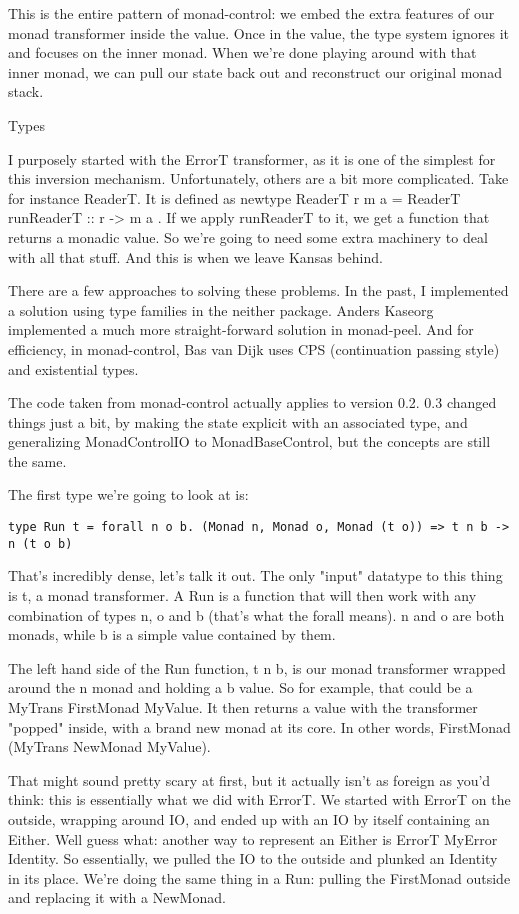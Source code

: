 This is the entire pattern of monad-control: we embed the extra features of our monad transformer inside the value. Once in the value, the type system ignores it and focuses on the inner monad. When we're done playing around with that inner monad, we can pull our state back out and reconstruct our original monad stack.

Types

I purposely started with the ErrorT transformer, as it is one of the simplest for this inversion mechanism. Unfortunately, others are a bit more complicated. Take for instance ReaderT. It is defined as newtype ReaderT r m a = ReaderT { runReaderT :: r -> m a }. If we apply runReaderT to it, we get a function that returns a monadic value. So we're going to need some extra machinery to deal with all that stuff. And this is when we leave Kansas behind.

There are a few approaches to solving these problems. In the past, I implemented a solution using type families in the neither package. Anders Kaseorg implemented a much more straight-forward solution in monad-peel. And for efficiency, in monad-control, Bas van Dijk uses CPS (continuation passing style) and existential types.

The code taken from monad-control actually applies to version 0.2. 0.3 changed things just a bit, by making the state explicit with an associated type, and generalizing MonadControlIO to MonadBaseControl, but the concepts are still the same.

The first type we're going to look at is:

\begin{lstlisting}
type Run t = forall n o b. (Monad n, Monad o, Monad (t o)) => t n b -> n (t o b)
\end{lstlisting}

That's incredibly dense, let's talk it out. The only "input" datatype to this thing is t, a monad transformer. A Run is a function that will then work with any combination of types n, o and b (that's what the forall means). n and o are both monads, while b is a simple value contained by them.

The left hand side of the Run function, t n b, is our monad transformer wrapped around the n monad and holding a b value. So for example, that could be a MyTrans FirstMonad MyValue. It then returns a value with the transformer "popped" inside, with a brand new monad at its core. In other words, FirstMonad (MyTrans NewMonad MyValue).

That might sound pretty scary at first, but it actually isn't as foreign as you'd think: this is essentially what we did with ErrorT. We started with ErrorT on the outside, wrapping around IO, and ended up with an IO by itself containing an Either. Well guess what: another way to represent an Either is ErrorT MyError Identity. So essentially, we pulled the IO to the outside and plunked an Identity in its place. We're doing the same thing in a Run: pulling the FirstMonad outside and replacing it with a NewMonad.

